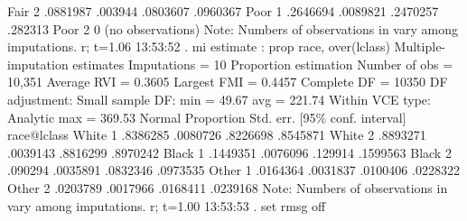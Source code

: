         Fair 2  {\VBAR}   .0881987    .003944      .0803607    .0960367
        Poor 1  {\VBAR}   .2646694   .0089821      .2470257     .282313
        Poor 2  {\VBAR}          0  (no observations)
Note: Numbers of observations in {} vary among imputations.
r; t=1.06 13:53:52
{\smallskip}
. mi estimate : prop race, over(lclass)
{\smallskip}
Multiple-imputation estimates     Imputations     =         10
Proportion estimation             Number of obs   =     10,351
                                  Average RVI     =     0.3605
                                  Largest FMI     =     0.4457
                                  Complete DF     =      10350
DF adjustment:   Small sample     DF:     min     =      49.67
                                          avg     =     221.74
Within VCE type:     Analytic             max     =     369.53
{\smallskip}
             {\VBAR}                                   Normal
             {\VBAR} Proportion   Std. err.     [95\% conf. interval]
 race@lclass {\VBAR}
    White 1  {\VBAR}   .8386285   .0080726      .8226698    .8545871
    White 2  {\VBAR}   .8893271   .0039143      .8816299    .8970242
    Black 1  {\VBAR}   .1449351   .0076096       .129914    .1599563
    Black 2  {\VBAR}    .090294   .0035891      .0832346    .0973535
    Other 1  {\VBAR}   .0164364   .0031837      .0100406    .0228322
    Other 2  {\VBAR}   .0203789   .0017966      .0168411    .0239168
Note: Numbers of observations in {} vary among imputations.
r; t=1.00 13:53:53
{\smallskip}
. set rmsg off
{\smallskip}
